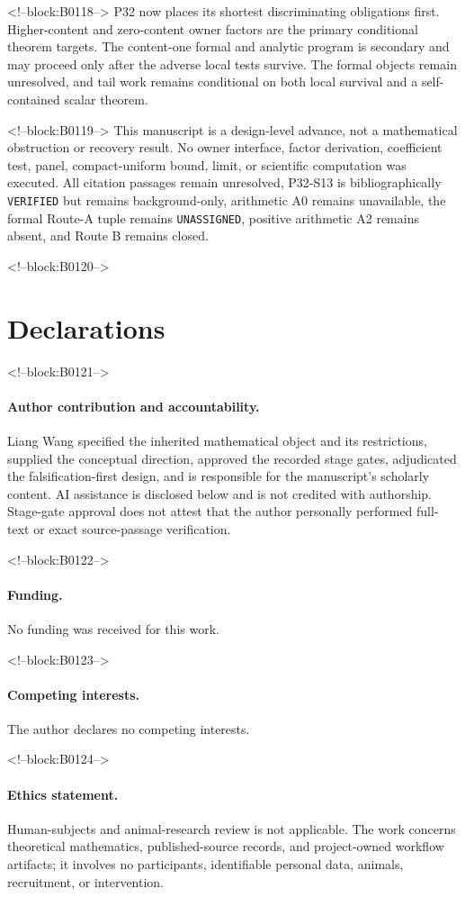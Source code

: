 \documentclass[11pt]{article}
\begin{document}
<!--block:B0118-->
P32 now places its shortest discriminating obligations first.
Higher-content and zero-content owner factors are the primary
conditional theorem targets. The content-one formal and analytic program
is secondary and may proceed only after the adverse local tests survive.
The formal objects remain unresolved, and tail work remains conditional
on both local survival and a self-contained scalar theorem.

<!--block:B0119-->
This manuscript is a design-level advance, not a mathematical obstruction
or recovery result. No owner interface, factor derivation, coefficient
test, panel, compact-uniform bound, limit, or scientific computation was
executed. All citation passages remain unresolved, P32-S13 is
bibliographically \texttt{VERIFIED} but remains background-only, arithmetic A0 remains
unavailable, the formal Route-A tuple remains \texttt{UNASSIGNED},
positive arithmetic A2 remains absent, and Route B remains closed.

<!--block:B0120-->
\section*{Declarations}

<!--block:B0121-->
\paragraph{Author contribution and accountability.}
Liang Wang specified the inherited mathematical object and its
restrictions, supplied the conceptual direction, approved the recorded
stage gates, adjudicated the falsification-first design, and is
responsible for the manuscript's scholarly content. AI assistance is
disclosed below and is not credited with authorship. Stage-gate approval
does not attest that the author personally performed full-text or exact
source-passage verification.

<!--block:B0122-->
\paragraph{Funding.} No funding was received for this work.

<!--block:B0123-->
\paragraph{Competing interests.} The author declares no competing
interests.

<!--block:B0124-->
\paragraph{Ethics statement.} Human-subjects and animal-research review
is not applicable. The work concerns theoretical mathematics,
published-source records, and project-owned workflow artifacts; it
involves no participants, identifiable personal data, animals,
recruitment, or intervention.
\end{document}
